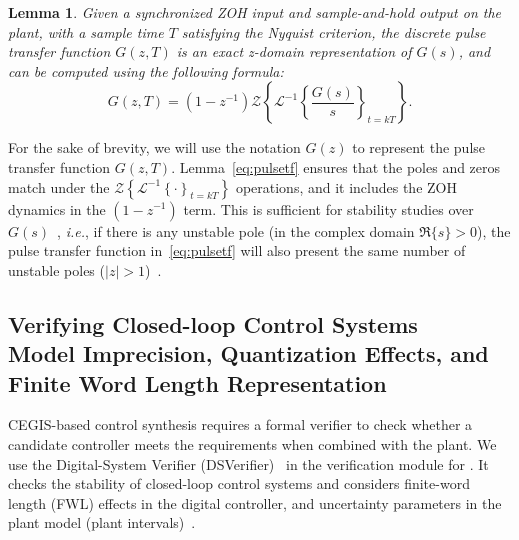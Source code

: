 \documentclass[final]{sig-alternate-05-2015}
\newcommand{\blue}[1]{{\color{blue}#1}}
\newcommand{\red}[1]{{\color{red}#1}}
\newtheorem{mylemma}{Lemma}
\begin{document}
\begin{mylemma}\cite{astrom1997computer}
%
Given a synchronized ZOH input and sample-and-hold output on the plant, 
with a sample time $T$ satisfying the Nyquist criterion, the discrete pulse
transfer function $G(z,T)$ is an exact z-domain representation of $G(s)$, 
and can be computed using the following formula:
%
\begin{equation}
\label{eq:pulsetf}
G(z,T) = %
(1-z^{-1})\mathcal{Z}\left\lbrace{\mathcal{L}^{-1}\left\lbrace{\frac{G(s)}{s}}\right\rbrace_{t=kT}}\right\rbrace.
\end{equation}
%
\end{mylemma}
%
For the sake of brevity, we will use the notation $G(z)$ to represent the
pulse transfer function $G(z,T)$.
% 
Lemma~\ref{eq:pulsetf} ensures that the poles and zeros match under the
$\mathcal{Z}\left\lbrace{\mathcal{L}^{-1}\left\lbrace{\cdot}\right\rbrace_{t=kT}}\right\rbrace$
operations, and it includes the ZOH dynamics in the $(1-z^{-1})$ term. 
This is sufficient for stability studies over $G(s)$~\cite{fadali}, {\it i.e.}, if there is any unstable pole (in the complex domain $\Re\{s\} > 0$), 
the pulse transfer function in~\eqref{eq:pulsetf} will also present the same number of unstable poles ($|z| > 1$)~\cite{Franklin15}.

\subsection{Verifying Closed-loop Control Systems \\ \blue{Model Imprecision, Quantization Effects, and Finite Word Length Representation}}
\label{verifying-closed-loop-control-systems}




CEGIS-based control synthesis requires a formal verifier to check whether a
candidate controller meets the requirements when combined with the plant. 
We use the Digital-System Verifier (DSVerifier)~\cite{IsmailBCFF15} in the
verification module for \tool.  It checks the stability of closed-loop control systems and
considers finite-word length (FWL) effects in the digital controller, and
uncertainty parameters in the plant model (plant intervals)~\cite{Bessa16}.  
\end{document}
